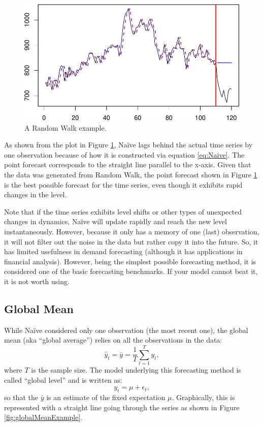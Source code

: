 \documentclass[
]{book}
\theoremstyle{definition}
\theoremstyle{definition}
\theoremstyle{definition}
\theoremstyle{definition}
\theoremstyle{remark}
\begin{document}
\begin{figure}
\centering
\includegraphics{Svetunkov--2022----ADAM_files/figure-latex/naiveExample-1.pdf}
\caption{\label{fig:naiveExample}A Random Walk example.}
\end{figure}

As shown from the plot in Figure \ref{fig:naiveExample}, Naïve lags behind the actual time series by one observation because of how it is constructed via equation \eqref{eq:Naive}. The point forecast corresponds to the straight line parallel to the x-axis. Given that the data was generated from Random Walk, the point forecast shown in Figure \ref{fig:naiveExample} is the best possible forecast for the time series, even though it exhibits rapid changes in the level.

Note that if the time series exhibits level shifts or other types of unexpected changes in dynamics, Naïve will update rapidly and reach the new level instantaneously. However, because it only has a memory of one (last) observation, it will not filter out the noise in the data but rather copy it into the future. So, it has limited usefulness in demand forecasting (although it has applications in financial analysis). However, being the simplest possible forecasting method, it is considered one of the basic forecasting benchmarks. If your model cannot beat it, it is not worth using.

\hypertarget{GlobalMean}{%
\subsection{Global Mean}\label{GlobalMean}}

While Naïve considered only one observation (the most recent one), the global mean (aka ``global average'') relies on all the observations in the data:
\begin{equation}
    \hat{y}_t = \bar{y} = \frac{1}{T} \sum_{t=1}^T y_{t} ,
    \label{eq:GlobalMean}
\end{equation}
where \(T\) is the sample size. The model underlying this forecasting method is called ``global level'' and is written as:
\begin{equation}
    y_t = \mu + \epsilon_t,
    \label{eq:GlobalLevel}
\end{equation}
so that the \(\bar{y}\) is an estimate of the fixed expectation \(\mu\). Graphically, this is represented with a straight line going through the series as shown in Figure \ref{fig:globalMeanExample}.
\end{document}
